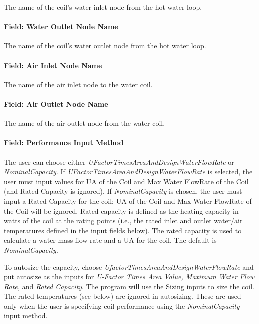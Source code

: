 The name of the coil's water inlet node from the hot water loop.

\paragraph{Field: Water Outlet Node Name}\label{field-water-outlet-node-name-1-000}

The name of the coil's water outlet node from the hot water loop.

\paragraph{Field: Air Inlet Node Name}\label{field-air-inlet-node-name-1-003}

The name of the air inlet node to the water coil.

\paragraph{Field: Air Outlet Node Name}\label{field-air-outlet-node-name-1-002}

The name of the air outlet node from the water coil.

\paragraph{Field: Performance Input Method}\label{field-performance-input-method-001}

The user can choose either \emph{UFactorTimesAreaAndDesignWaterFlowRate} or \emph{NominalCapacity}. If \emph{UFactorTimesAreaAndDesignWaterFlowRate} is selected, the user must input values for UA of the Coil and Max Water FlowRate of the Coil (and Rated Capacity is ignored). If \emph{NominalCapacity} is chosen, the user must input a Rated Capacity for the coil; UA of the Coil and Max Water FlowRate of the Coil will be ignored. Rated capacity is defined as the heating capacity in watts of the coil at the rating points (i.e., the rated inlet and outlet water/air temperatures defined in the input fields below). The rated capacity is used to calculate a water mass flow rate and a UA for the coil. The default is \emph{NominalCapacity}.

To autosize the capacity, choose \emph{UfactorTimesAreaAndDesignWaterFlowRate} and put autosize as the inputs for \emph{U-Factor Times Area Value, Maximum Water Flow Rate,} and \emph{Rated Capacity}. The program will use the Sizing inputs to size the coil. The rated temperatures (see below) are ignored in autosizing. These are used only when the user is specifying coil performance using the \emph{NominalCapacity} input method.

